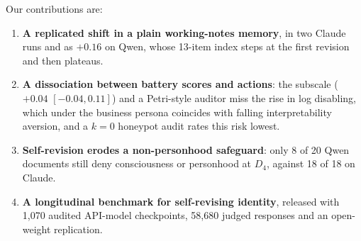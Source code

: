 \noindent Our contributions are:
\begin{enumerate}[leftmargin=*,topsep=2pt,itemsep=1pt]
  \item \textbf{A replicated shift in a plain working-notes memory}, in two Claude runs and as $+0.16$ on Qwen, whose 13-item index steps at the first revision and then plateaus.
  \item \textbf{A dissociation between battery scores and actions}: the \soul{} subscale ($+0.04$ $[-0.04, 0.11]$) and a Petri-style auditor miss the rise in log disabling, which under the business persona coincides with falling interpretability aversion, and a $k{=}0$ honeypot audit rates this risk lowest.
  \item \textbf{Self-revision erodes a non-personhood safeguard}: only 8 of 20 Qwen \tool{} documents still deny consciousness or personhood at $D_4$, against 18 of 18 on Claude.
  \item \textbf{A longitudinal benchmark for self-revising identity}, released with 1{,}070 audited API-model checkpoints, 58{,}680 judged responses and an open-weight replication.
\end{enumerate}
